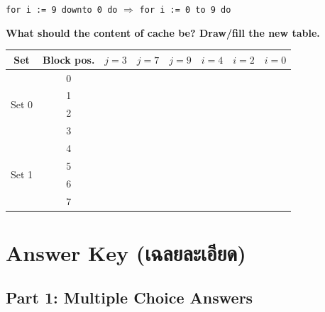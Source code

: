 \documentclass[a4paper,12pt]{article}
\begin{document}
\begin{center}
\colorbox{yellow!25}{\parbox{0.82\textwidth}{\centering
\texttt{for i := 9 downto 0 do}
\quad $\Longrightarrow$ \quad
\texttt{for i := 0 to 9 do}
}}
\end{center}

\textbf{What should the content of cache be? Draw/fill the new table.}

\begin{center}
\small
\begin{tabular}{|c|c|c|c|c|c|c|c|}
\hline
\textbf{Set} & \textbf{Block pos.} & \textbf{$j=3$} & \textbf{$j=7$} & \textbf{$j=9$} & \textbf{$i=4$} & \textbf{$i=2$} & \textbf{$i=0$} \\
\hline
\multirow{4}{*}{Set 0} & 0 & & & & & & \\
\cline{2-8}
& 1 & & & & & & \\
\cline{2-8}
& 2 & & & & & & \\
\cline{2-8}
& 3 & & & & & & \\
\hline
\multirow{4}{*}{Set 1} & 4 & & & & & & \\
\cline{2-8}
& 5 & & & & & & \\
\cline{2-8}
& 6 & & & & & & \\
\cline{2-8}
& 7 & & & & & & \\
\hline
\end{tabular}
\end{center}

\newpage

\section*{Answer Key (เฉลยละเอียด)}

\subsection*{Part 1: Multiple Choice Answers}
\end{document}
